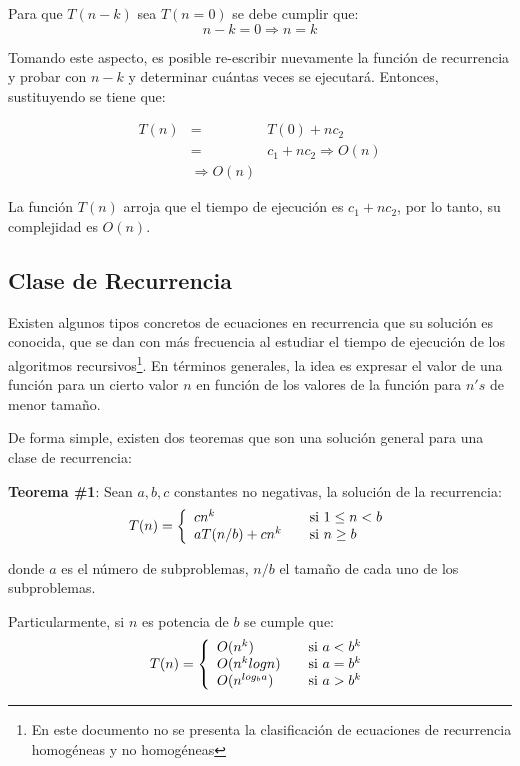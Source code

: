 Para que $T(n-k)$ sea $T(n=0)$ se debe cumplir que:
$$n - k = 0 \Rightarrow n = k$$

Tomando este aspecto, es posible re-escribir nuevamente la función de recurrencia y probar con $n-k$ y determinar cuántas veces se ejecutará. Entonces, sustituyendo se tiene que:

\begin{eqnarray*}
T(n)&=&T(0) + nc_2\\
&=&c_1 + nc_2 \Rightarrow O(n) \\
&\Rightarrow O(n)
\end{eqnarray*}

La función $T(n)$ arroja que el tiempo de ejecución es $c_1 + nc_2$, por lo tanto, su complejidad es $O(n)$.

\subsection{Clase de Recurrencia}

Existen algunos tipos concretos de ecuaciones en recurrencia que su solución es conocida, que se dan con más frecuencia al estudiar el tiempo de ejecución de los
algoritmos recursivos\footnote{En este documento no se presenta la clasificación de ecuaciones de recurrencia homogéneas y no homogéneas}. En términos generales, la idea es expresar el valor de una función para un cierto valor $n$ en función de los valores de la función para $n's$ de menor tamaño.

De forma simple, existen dos teoremas que son una solución general para una clase de recurrencia:

\textbf{Teorema \#1}: Sean $a, b, c$ constantes no negativas, la solución de la recurrencia:
\begin{equation}
T(n) = \left\{
  \begin{array}{l l}
    cn^{k} & \quad \text{si $1 \le n < b$}\\
    aT(n/b) + cn^{k}& \quad \text{si $n \ge b$}
  \end{array} \right.
 \end{equation}
 
\noindent donde $a$ es el número de subproblemas, $n/b$ el tamaño de cada uno de los subproblemas.

Particularmente, si $n$ es potencia de $b$ se cumple que:
\begin{equation}
T(n) = \left\{
  \begin{array}{l l}
    O(n^{k}) & \quad \text{si $a < b^{k}$}\\
    O(n^{k}logn) & \quad \text{si $a = b^{k}$}\\
    O(n^{log_b a}) & \quad \text{si $a > b^{k}$}
  \end{array} \right.
\end{equation}

